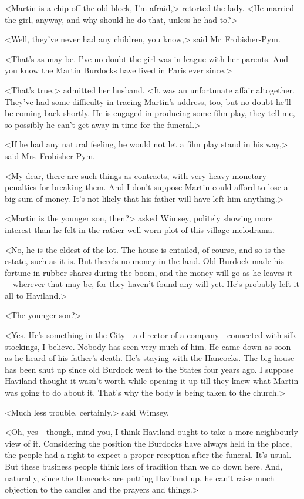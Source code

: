 <Martin is a chip off the old block, I'm afraid,> retorted the lady. <He married the girl, anyway, and why should he do that, unless he had to?>

<Well, they've never had any children, you know,> said Mr~Frobisher-Pym.

<That's as may be. I've no doubt the girl was in league with her parents. And you know the Martin Burdocks have lived in Paris ever since.>

<That's true,> admitted her husband. <It was an unfortunate affair altogether. They've had some difficulty in tracing Martin's address, too, but no doubt he'll be coming back shortly. He is engaged in producing some film play, they tell me, so possibly he can't get away in time for the funeral.>

<If he had any natural feeling, he would not let a film play stand in his way,> said Mrs~Frobisher-Pym.

<My dear, there are such things as contracts, with very heavy monetary penalties for breaking them. And I don't suppose Martin could afford to lose a big sum of money. It's not likely that his father will have left him anything.>

<Martin is the younger son, then?> asked Wimsey, politely showing more interest than he felt in the rather well-worn plot of this village melodrama.

<No, he is the eldest of the lot. The house is entailed, of course, and so is the estate, such as it is. But there's no money in the land. Old Burdock made his fortune in rubber shares during the boom, and the money will go as he leaves it—wherever that may be, for they haven't found any will yet. He's probably left it all to Haviland.>

<The younger son?>

<Yes. He's something in the City—a director of a company—connected with silk stockings, I believe. Nobody has seen very much of him. He came down as soon as he heard of his father's death. He's staying with the Hancocks. The big house has been shut up since old Burdock went to the States four years ago. I suppose Haviland thought it wasn't worth while opening it up till they knew what Martin was going to do about it. That's why the body is being taken to the church.>

<Much less trouble, certainly,> said Wimsey.

<Oh, yes—though, mind you, I think Haviland ought to take a more neighbourly view of it. Considering the position the Burdocks have always held in the place, the people had a right to expect a proper reception after the funeral. It's usual. But these business people think less of tradition than we do down here. And, naturally, since the Hancocks are putting Haviland up, he can't raise much objection to the candles and the prayers and things.>

